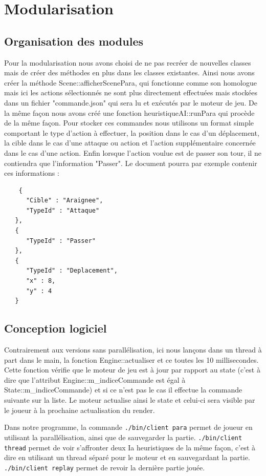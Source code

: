 \documentclass[a4paper,12pt]{article}
\begin{document}
\clearpage
\section{Modularisation}
\label{sec:module}

\subsection{Organisation des modules}
Pour la modularisation nous avons choisi de ne pas recréer de nouvelles classes mais de créer des méthodes en plus dans les classes existantes. Ainsi nous avons créer la méthode Scene::afficherScenePara, qui fonctionne comme son homologue mais ici les actions sélectionnés ne sont plus directement effectuées mais stockées dans un fichier "commande.json" qui sera lu et exécutés par le moteur de jeu. De la même façon nous avons créé une fonction heuristiqueAI::runPara qui procède de la même façon. Pour stocker ces commandes nous utilisons un format simple comportant le type d'action à effectuer, la position dans le cas d'un déplacement, la cible dans le cas d'une attaque ou action et l'action supplémentaire concernée dans le cas d'une action. Enfin lorsque l'action voulue est de passer son tour, il ne contiendra que l'information "Passer". Le document pourra par exemple contenir ces informations :

\begin{lstlisting}
    {
      "Cible" : "Araignee",
      "TypeId" : "Attaque"
   },
   {
      "TypeId" : "Passer"
   },
   {
      "TypeId" : "Deplacement",
      "x" : 8,
      "y" : 4
   }
\end{lstlisting}

\subsection{Conception logiciel}
Contrairement aux versions sans parallélisation, ici nous lançons dans un thread à part dans le main, la fonction Engine::actualiser et ce toutes les 10 millisecondes. Cette fonction vérifie que le moteur de jeu est à jour par rapport au state (c'est à dire que l'attribut Engine::m\_indiceCommande est égal à State::m\_indiceCommande) et si ce n'est pas le cas il effectue la commande suivante sur la liste. Le moteur actualise ainsi le state et celui-ci sera visible par le joueur à la prochaine actualisation du render.

Dans notre programme, la commande \texttt{./bin/client para} permet de joueur en utilisant la parallélisation, ainsi que de sauvegarder la partie. \texttt{./bin/client thread} permet de voir s'affronter deux Ia heuristiques de la même façon, c'est à dire en utilisant un thread séparé pour le moteur et en sauvegardant la partie. \texttt{./bin/client replay} permet de revoir la dernière partie jouée.

%
\end{document}
